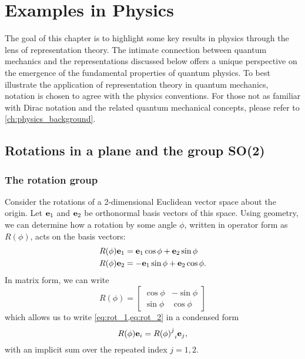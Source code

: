 \chapter{Examples in Physics}\label{ch:Phys_applications}

The goal of this chapter is to highlight some key results in physics through the lens of representation theory. The intimate connection between quantum mechanics and the representations discussed below offers a unique perspective on the emergence of the fundamental properties of quantum physics. To best illustrate the application of representation theory in quantum mechanics, notation is chosen to agree with the physics conventions. For those not as familiar with Dirac notation and the related quantum mechanical concepts, please refer to \cref{ch:physics_background}.

\section{Rotations in a plane and the group SO(2)}\label{sec:SO2}


\subsection{The rotation group}
Consider the rotations of a 2-dimensional Euclidean vector space about the origin. Let $\mathbf{e}_1$ and $\mathbf{e}_2$ be orthonormal basis vectors of this space. Using geometry, we can determine how a rotation by some angle $\phi$, written in operator form as $R(\phi)$, acts on the basis vectors:
\begin{align}
    R(\phi)\mathbf{e}_1 &= \mathbf{e}_1\cos\phi + \mathbf{e}_2\sin\phi \label{eq:rot_1}\\
    R(\phi)\mathbf{e}_2 &= -\mathbf{e}_1\sin\phi + \mathbf{e}_2\cos\phi.\label{eq:rot_2}
\end{align}
In matrix form, we can write
\begin{equation}
    R(\phi) = 
    \begin{bmatrix}
        \cos\phi & -\sin\phi \\
        \sin\phi & \cos\phi
    \end{bmatrix}
\end{equation}
which allows us to write \cref{eq:rot_1,eq:rot_2} in a condensed form
\begin{equation}
    R(\phi)\mathbf{e}_i = {{R(\phi)}^j}_i\mathbf{e}_j,
\end{equation}
with an implicit sum over the repeated index $j=1,2$.

